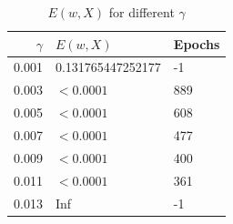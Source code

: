 \documentclass[12pt]{article}
\begin{document}
\begin{table}
\centering
\begin{tabular}{rll} 
  \hline
  $\gamma$ & $E(w,X)$ & Epochs \\
  \hline \hline
  0.001 & 0.131765447252177 & -1 \\
  \hline
  0.003 & $<0.0001$ & 889 \\
  \hline
  0.005 & $<0.0001$ & 608 \\
  \hline
  0.007 & $<0.0001$ & 477 \\
  \hline
  0.009 & $<0.0001$ & 400 \\
  \hline
  0.011 & $<0.0001$ & 361 \\
  \hline
   0.013 & Inf & -1 \\
  \hline
\end{tabular}
\label{table:gammaSSE}
\caption{$E(w,X)$ for different $\gamma$}
\end{table}
\end{document}
